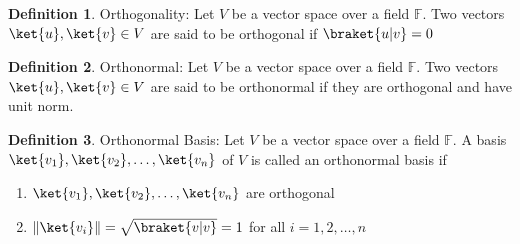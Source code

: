 \documentclass[12pt, oneside]{book}
\theoremstyle{definition}
\newtheorem{definition}{Definition}[section]
\theoremstyle{definition}
\theoremstyle{remark}
\begin{document}
\begin{definition}
    Orthogonality: Let $V$ be a vector space over a field $\mathbb{F}$. Two vectors $\ket{u},\ket{v}\in V$ are said to be orthogonal if $\braket{u|v}=0$
\end{definition}

\begin{definition}
    Orthonormal: Let $V$ be a vector space over a field $\mathbb{F}$. Two vectors $\ket{u},\ket{v}\in V$ are said to be orthonormal if they are orthogonal and have unit norm.
\end{definition}

\begin{definition}
    Orthonormal Basis: Let $V$ be a vector space over a field $\mathbb{F}$. A basis $\ket{v_1},\ket{v_2},\ldots,\ket{v_n}$ of $V$ is called an orthonormal basis if
    \begin{enumerate}
        \item $\ket{v_1},\ket{v_2},\ldots,\ket{v_n}$ are orthogonal
        \item $\|\ket{v_i}\|= \sqrt{\braket{v|v}} = 1$ for all $i=1,2,\ldots,n$
    \end{enumerate}
\end{definition}
\end{document}
